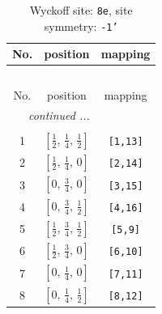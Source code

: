 \documentclass[fleqn,8pt]{jsarticle}
\begin{document}
\renewcommand{\arraystretch}{1.2}
\begin{longtable}{ccc}
\caption{Wyckoff site: {\tt 8e}, site symmetry: {\tt -1'}}
 \\
 \hline \hline
No. & position & mapping \\ \hline \endfirsthead

\multicolumn{2}{l}{\tablename\ \thetable{}} \\
 \hline \hline
No. & position & mapping \\ \hline \endhead

 \hline \hline
\multicolumn{2}{r}{\footnotesize\it continued ...} \\ \endfoot

 \hline \hline
\multicolumn{2}{r}{} \\ \endlastfoot

1 & $\left[ \frac{1}{2},\, \frac{1}{4},\, \frac{1}{2} \right]$ & {\tt [1,13]} \\ \hline
2 & $\left[ \frac{1}{2},\, \frac{1}{4},\, 0 \right]$ & {\tt [2,14]} \\ \hline
3 & $\left[ 0,\, \frac{3}{4},\, 0 \right]$ & {\tt [3,15]} \\ \hline
4 & $\left[ 0,\, \frac{3}{4},\, \frac{1}{2} \right]$ & {\tt [4,16]} \\ \hline
5 & $\left[ \frac{1}{2},\, \frac{3}{4},\, \frac{1}{2} \right]$ & {\tt [5,9]} \\ \hline
6 & $\left[ \frac{1}{2},\, \frac{3}{4},\, 0 \right]$ & {\tt [6,10]} \\ \hline
7 & $\left[ 0,\, \frac{1}{4},\, 0 \right]$ & {\tt [7,11]} \\ \hline
8 & $\left[ 0,\, \frac{1}{4},\, \frac{1}{2} \right]$ & {\tt [8,12]} \\
\end{longtable}
\renewcommand{\arraystretch}{1.2}
\end{document}

